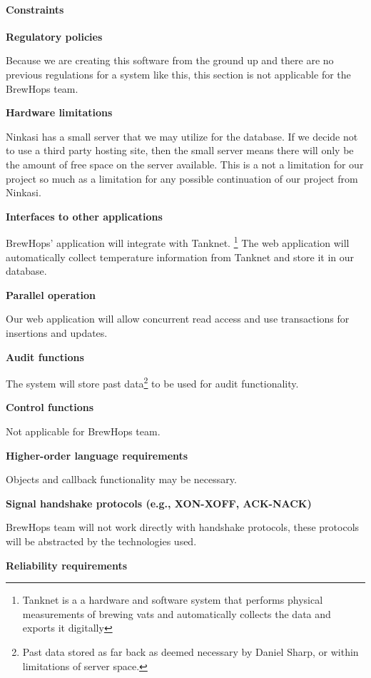 	\paragraph{Constraints}
		\textbf{Regulatory policies}

		Because we are creating this software from the ground up and there are no previous regulations for a system like this, this section is not applicable for the BrewHops team.

		\textbf{Hardware limitations}

		Ninkasi has a small server that we may utilize for the database.
		If we decide not to use a third party hosting site, then the small server means there will only be the amount of free space on the server available.
		This is a not a limitation for our project so much as a limitation for any possible continuation of our project from Ninkasi.

		\textbf{Interfaces to other applications}

		BrewHops’ application will integrate with Tanknet.
		\footnote{Tanknet is a a hardware and software system that performs physical measurements of brewing vats and automatically collects the data and exports it digitally}
		The web application will automatically collect temperature information from Tanknet and store it in our database.

		\textbf{Parallel operation}

        Our web application will allow concurrent read access and use transactions for insertions and updates.

		\textbf{Audit functions}

        The system will store past data\footnote{Past data stored as far back as deemed necessary by Daniel Sharp, or within limitations of server space.} to be used for audit functionality.

		\textbf{Control functions}

        Not applicable for BrewHops team.

		\textbf{Higher-order language requirements}

        Objects and callback functionality may be necessary.

		\textbf{Signal handshake protocols (e.g., XON-XOFF, ACK-NACK)}

        BrewHops team will not work directly with handshake protocols, these protocols will be abstracted by the technologies used.

		\textbf{Reliability requirements}


